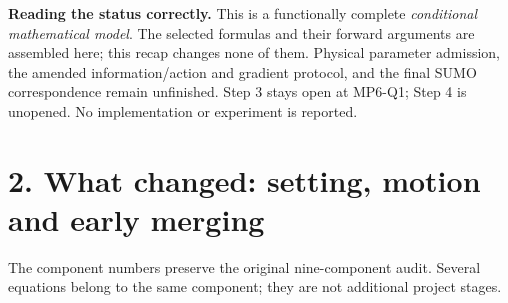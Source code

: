 \documentclass[11pt,a4paper]{article}
\begin{document}
\textbf{Reading the status correctly.} This is a functionally complete
\emph{conditional mathematical model}. The selected formulas and their
forward arguments are assembled here; this recap changes none of them.
Physical parameter admission, the amended information/action and gradient
protocol, and the final SUMO correspondence remain unfinished. Step 3 stays
open at MP6-Q1; Step 4 is unopened. No implementation or experiment is reported.

\newpage
\section*{2. What changed: setting, motion and early merging}
The component numbers preserve the original nine-component audit. Several
equations belong to the same component; they are not additional project stages.
\end{document}
